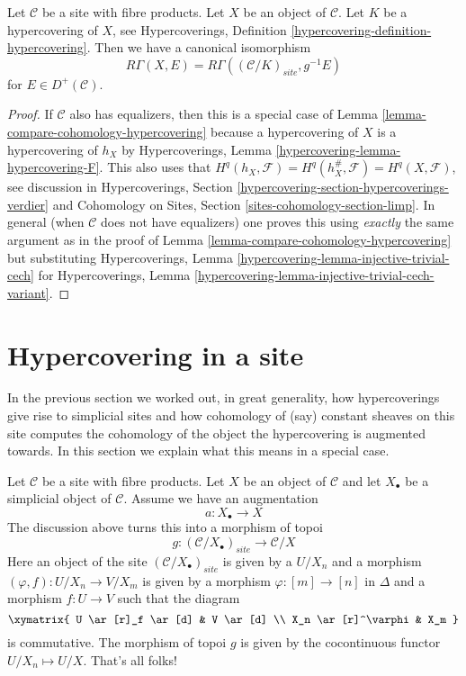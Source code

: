 \begin{lemma}
\label{lemma-compare-cohomology-hypercovering-X}
Let $\mathcal{C}$ be a site with fibre products. Let $X$ be an object of
$\mathcal{C}$. Let $K$ be a hypercovering of $X$, see
Hypercoverings, Definition
\ref{hypercovering-definition-hypercovering}.
Then we have a canonical isomorphism
$$
R\Gamma(X, E) =
R\Gamma((\mathcal{C}/K)_{site}, g^{-1}E)
$$
for $E \in D^+(\mathcal{C})$.
\end{lemma}

\begin{proof}
If $\mathcal{C}$ also has equalizers, then this is a special case of
Lemma \ref{lemma-compare-cohomology-hypercovering}
because a hypercovering of $X$ is a hypercovering of $h_X$ by
Hypercoverings, Lemma \ref{hypercovering-lemma-hypercovering-F}.
This also uses that
$H^q(h_X, \mathcal{F}) = H^q(h_X^\#, \mathcal{F}) = H^q(X, \mathcal{F})$,
see discussion in
Hypercoverings, Section \ref{hypercovering-section-hypercoverings-verdier}
and
Cohomology on Sites, Section \ref{sites-cohomology-section-limp}.
In general (when $\mathcal{C}$ does not have equalizers) one proves
this using {\it exactly} the same argument as in the proof of
Lemma \ref{lemma-compare-cohomology-hypercovering}
but substituting
Hypercoverings, Lemma \ref{hypercovering-lemma-injective-trivial-cech}
for
Hypercoverings, Lemma \ref{hypercovering-lemma-injective-trivial-cech-variant}.
\end{proof}






\section{Hypercovering in a site}
\label{section-hypercovering}

\noindent
In the previous section we worked out, in great generality, how
hypercoverings give rise to simplicial sites and how cohomology
of (say) constant sheaves on this site computes the cohomology
of the object the hypercovering is augmented towards. In this section
we explain what this means in a special case.

\medskip\noindent
Let $\mathcal{C}$ be a site with fibre products. Let $X$ be an object of
$\mathcal{C}$ and let $X_\bullet$ be a simplicial object of $\mathcal{C}$.
Assume we have an augmentation
$$
a : X_\bullet \to X
$$
The discussion above turns this into a morphism of topoi
$$
g : (\mathcal{C}/X_\bullet)_{site} \longrightarrow \mathcal{C}/X
$$
Here an object of the site $(\mathcal{C}/X_\bullet)_{site}$ is given by
a $U/X_n$ and a morphism $(\varphi, f) : U/X_n \to V/X_m$ is given
by a morphism $\varphi : [m] \to [n]$ in $\Delta$ and a morphism
$f : U \to V$ such that the diagram
$$
\xymatrix{
U \ar[r]_f \ar[d] & V \ar[d] \\
X_n \ar[r]^\varphi & X_m
}
$$
is commutative. The morphism of topoi $g$ is given by the cocontinuous
functor $U/X_n \mapsto U/X$. That's all folks!

